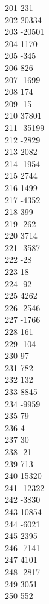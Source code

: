 { 201	231 \\
 202	20334 \\
 203	-20501 \\
 204	1170 \\
 205	-345 \\
 206	826 \\
 207	-1699 \\
 208	174 \\
 209	-15 \\
 210	37801 \\
 211	-35199 \\
 212	-2829 \\
 213	2082 \\
 214	-1954 \\
 215	2744 \\
 216	1499 \\
 217	-4352 \\
 218	399 \\
 219	-262 \\
 220	3714 \\
 221	-3587 \\
 222	-28 \\
 223	18 \\
 224	-92 \\
 225	4262 \\
 226	-2546 \\
 227	-1766 \\
 228	161 \\
 229	-104 \\
 230	97 \\
 231	782 \\
 232	132 \\
 233	8845 \\
 234	-9959 \\
 235	79 \\
 236	4 \\
 237	30 \\
 238	-21 \\
 239	713 \\
 240	15320 \\
 241	-12322 \\
 242	-3830 \\
 243	10854 \\
 244	-6021 \\
 245	2395 \\
 246	-7141 \\
 247	4101 \\
 248	-2817 \\
 249	3051 \\
 250	552 \\
}
